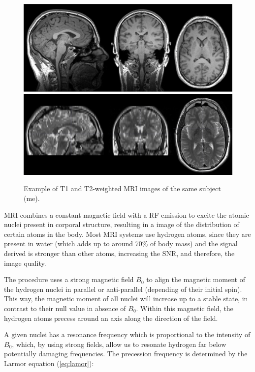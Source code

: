 \begin{figure}[htp]
	\centering
	\includegraphics[width=0.7\linewidth]{Graphics/ch2/example_MRIT1}\\
	\includegraphics[width=0.7\linewidth]{Graphics/ch2/example_MRIT2}
	\caption[Example of T1 and T2-weighted \acs{MRI} images.]{Example of T1 and T2-weighted \ac{MRI} images of the same subject (me).}
	\label{fig:example_MRI}
\end{figure}

\ac{MRI} combines a constant magnetic field with a \ac{RF} emission to excite the atomic nuclei present in corporal structure, resulting in a image of the distribution of certain atoms in the body. Most \ac{MRI} systems use hydrogen atoms, since they are present in water (which adds up to around 70\% of body mass) and the signal derived is stronger than other atoms, increasing the \ac{SNR}, and therefore, the image quality. 

The procedure uses a strong magnetic field $B_0$ to align the magnetic moment of the hydrogen nuclei in parallel or anti-parallel (depending of their initial spin). This way, the magnetic moment of all nuclei will increase up to a stable state, in contrast to their null value in absence of $B_0$. Within this magnetic field, the hydrogen atoms precess around an axis along the direction of the field. 

A given nuclei has a resonance frequency which is proportional to the intensity of $B_0$, which, by using strong fields, allow us to resonate hydrogen far below potentially damaging frequencies. The precession frequency is determined by the Larmor equation (\ref{eq:lamor}):

